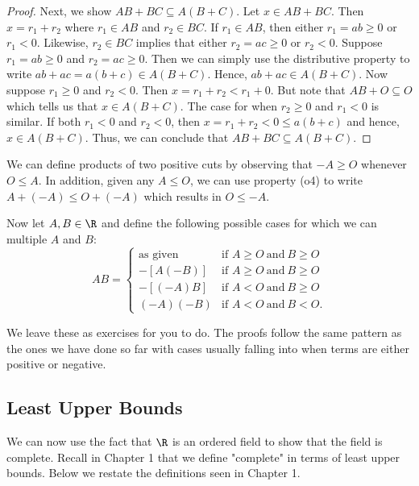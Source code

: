 \begin{enumerate}
\begin{proof}
        Next, we show \( AB + BC \subseteq A(B+C) \). Let \( x \in AB + BC \). Then \( x = r_{1} + r_{2}  \) where \( r_{1} \in AB \) and \( r_{2} \in BC \). If \( r_{1} \in AB  \), then either \( r_{1} = ab \geq 0  \) or \( r_{1} < 0  \). Likewise, \( r_{2} \in BC \) implies that either \( r_{2} = ac \geq 0  \) or \( r_{2} < 0  \). Suppose \( r_{1} = ab \geq 0  \) and \( r_{2} = ac \geq  0  \). Then we can simply use the distributive property to write \( ab + ac = a (b+c)  \in A(B+C)  \). Hence, \( ab + ac \in A(B+C) \). Now suppose \(  r_{1} \geq 0  \) and \( r_{2} < 0  \). Then \( x = r_{1} + r_{2} < r_{1} + 0 \). But note that \( AB + O \subseteq O  \) which tells us that \( x \in A(B+C) \). The case for when \( r_{2} \geq  0   \) and \( r_{1} < 0  \) is similar. If both \( r_{1} < 0  \) and \( r_{2} < 0  \), then \( x = r_{1} + r_{2} < 0 \leq a(b+c)  \) and hence, \( x \in A(B+C)  \). Thus, we can conclude that \( AB + BC \subseteq A(B+C) \).
        \end{proof}
\end{enumerate}

We can define products of two positive cuts by observing that \( -A \geq O  \) whenever \( O \leq A  \). In addition, given any \( A \leq O  \), we can use property (o4) to write \( A + (-A) \leq O + (-A) \) which results in \( O \leq -A  \). 

Now let \( A, B \in \R  \) and define the following possible cases for which we can multiple \( A  \) and \( B  \): 
\[  AB = 
\begin{cases}
    \text{as given} &\text{if } A \geq O \ \text{and} \ B \geq O \\
      -[A(-B)] &\text{if } A \geq O \ \text{and} \ B \geq O  \\
      -[(-A)B] &\text{if } A < O  \ \text{and} \ B \geq  O  \\
      (-A)(-B) &\text{if } A < O \ \text{and} \  B < O.
\end{cases} \]

We leave these as exercises for you to do. The proofs follow the same pattern as the ones we have done so far with cases usually falling into when terms are either positive or negative.

\subsection{Least Upper Bounds}

We can now use the fact that \( \R  \) is an ordered field to show that the field is complete. Recall in Chapter 1 that we define "complete" in terms of least upper bounds. Below we restate the definitions seen in Chapter 1.

